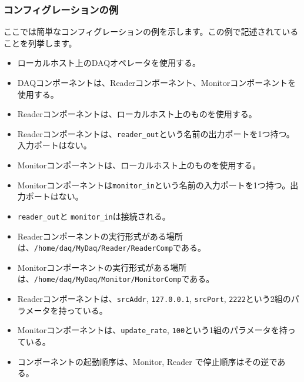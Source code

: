 \documentclass[a4j,10pt,dvips,onecolumn,oneside,final]{jarticle}%
\begin{document}
\subsubsection{コンフィグレーションの例}
ここでは簡単なコンフィグレーションの例を示します。この例で記述されていることを列挙します。
\begin{itemize}
\item ローカルホスト上のDAQオペレータを使用する。
\item DAQコンポーネントは、Readerコンポーネント、Monitorコンポーネントを使用する。
\item Readerコンポーネントは、ローカルホスト上のものを使用する。
\item Readerコンポーネントは、\verb|reader_out|という名前の出力ポートを1つ持つ。入力ポートはない。
\item Monitorコンポーネントは、ローカルホスト上のものを使用する。
\item Monitorコンポーネントは\verb|monitor_in|という名前の入力ポートを1つ持つ。出力ポートはない。
\item \verb|reader_out|と \verb|monitor_in|は接続される。
\item Readerコンポーネントの実行形式がある場所は、\verb|/home/daq/MyDaq/Reader/ReaderComp|である。
\item Monitorコンポーネントの実行形式がある場所は、\verb|/home/daq/MyDaq/Monitor/MonitorComp|である。
\item Readerコンポーネントは、{\verb|srcAddr|, \verb|127.0.0.1|}, {\verb|srcPort|, \verb|2222|}という2組のパラメータを持っている。
\item Monitorコンポーネントは、{\verb|update_rate|, \verb|100|}という1組のパラメータを持っている。
\item コンポーネントの起動順序は、Monitor, Reader で停止順序はその逆である。

\end{itemize}
\end{document}
